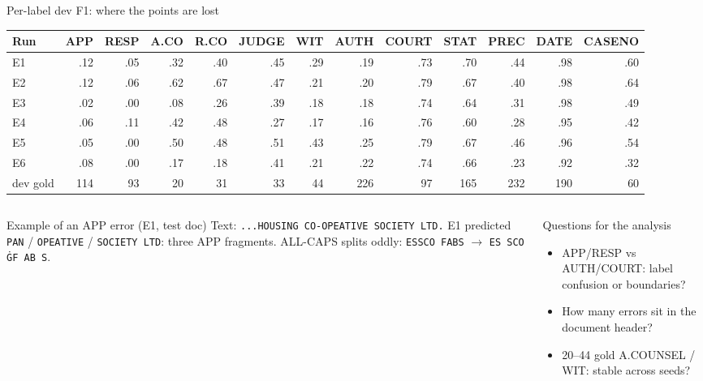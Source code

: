 \documentclass[aspectratio=169,11pt]{beamer}
\newcommand{\code}[1]{\texttt{\small #1}}
\begin{document}
\begin{frame}{Per-label dev F1: where the points are lost}
  \footnotesize
  \begin{center}
  \scriptsize
  \begin{tabular}{@{}lrrrrrrrrrrrr@{}}
    \toprule
    Run & APP & RESP & A.CO & R.CO & JUDGE & WIT & AUTH & COURT & STAT & PREC & DATE & CASENO \\
    \midrule
    E1 & .12 & .05 & .32 & .40 & .45 & .29 & .19 & .73 & .70 & .44 & .98 & .60 \\
    E2 & .12 & .06 & .62 & .67 & .47 & .21 & .20 & .79 & .67 & .40 & .98 & .64 \\
    E3 & .02 & .00 & .08 & .26 & .39 & .18 & .18 & .74 & .64 & .31 & .98 & .49 \\
    E4 & .06 & .11 & .42 & .48 & .27 & .17 & .16 & .76 & .60 & .28 & .95 & .42 \\
    E5 & .05 & .00 & .50 & .48 & .51 & .43 & .25 & .79 & .67 & .46 & .96 & .54 \\
    E6 & .08 & .00 & .17 & .18 & .41 & .21 & .22 & .74 & .66 & .23 & .92 & .32 \\
    \midrule
    dev gold & 114 & 93 & 20 & 31 & 33 & 44 & 226 & 97 & 165 & 232 & 190 & 60 \\
    \bottomrule
  \end{tabular}
  \end{center}
  \begin{columns}[T]
    \begin{column}{0.48\textwidth}
      \begin{block}{Example of an APP error (E1, test doc)}
        \scriptsize Text: \code{...HOUSING CO-OPEATIVE SOCIETY LTD.}
        E1 predicted \code{PAN} / \code{OPEATIVE} / \code{SOCIETY LTD}: three APP fragments.
        ALL-CAPS splits oddly: \code{ESSCO FABS} $\to$ \code{ES SCO ĠF AB S}.
      \end{block}
    \end{column}
    \begin{column}{0.48\textwidth}
      \begin{block}{Questions for the analysis}
        \scriptsize
        \begin{itemize}
          \item APP/RESP vs AUTH/COURT: label confusion or boundaries?
          \item How many errors sit in the document header?
          \item 20--44 gold A.COUNSEL / WIT: stable across seeds?
        \end{itemize}
      \end{block}
    \end{column}
  \end{columns}
\end{frame}
\end{document}
